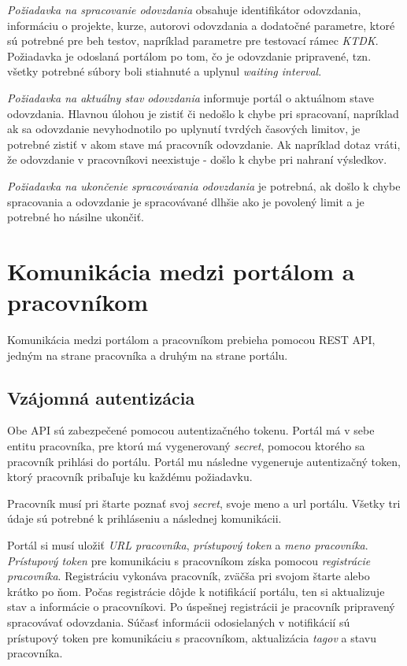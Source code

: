 \documentclass[
  digital, %
  twoside, %
  table,   %
  lof,     %
  lot,     %
]{fithesis3}
\begin{document}
\emph{Požiadavka na spracovanie odovzdania} obsahuje identifikátor odovzdania, informáciu o projekte, kurze, autorovi odovzdania a dodatočné parametre, ktoré sú potrebné pre beh testov, napríklad parametre pre testovací rámec \emph{KTDK}.
Požiadavka je odoslaná portálom po tom, čo je odovzdanie pripravené, tzn. všetky potrebné súbory boli stiahnuté a uplynul \emph{waiting interval}.

\emph{Požiadavka na aktuálny stav odovzdania} informuje portál o aktuálnom stave odovzdania. Hlavnou úlohou je zistiť či nedošlo k chybe pri spracovaní, napríklad ak sa odovzdanie nevyhodnotilo po uplynutí tvrdých časových limitov, je potrebné zistiť v akom stave má pracovník odovzdanie. Ak napríklad dotaz vráti, že odovzdanie v pracovníkovi neexistuje - došlo k chybe pri nahraní výsledkov.

\emph{Požiadavka na ukončenie spracovávania odovzdania} je potrebná, ak došlo k chybe spracovania a odovzdanie je spracovávané dlhšie ako je povolený limit a je potrebné ho násilne ukončiť.

\section{Komunikácia medzi portálom a pracovníkom}

Komunikácia medzi portálom a pracovníkom prebieha pomocou REST API, jedným na strane pracovníka a druhým na strane portálu. 

\subsection{Vzájomná autentizácia}

Obe API sú zabezpečené pomocou autentizačného tokenu. Portál má v sebe entitu pracovníka, pre ktorú má vygenerovaný \emph{secret}, pomocou ktorého sa pracovník prihlási do portálu. Portál mu následne vygeneruje autentizačný token, ktorý pracovník pribaľuje ku každému požiadavku.

Pracovník musí pri štarte poznať svoj \emph{secret}, svoje meno a url portálu. Všetky tri údaje sú potrebné k prihláseniu a následnej komunikácii. 

Portál si musí uložiť \emph{URL pracovníka}, \emph{prístupový token} a \emph {meno pracovníka}.
\emph{Prístupový token} pre komunikáciu s pracovníkom získa pomocou \emph{registrácie pracovníka}. Registráciu vykonáva pracovník, zväčša pri svojom štarte alebo krátko po ňom. Počas registrácie dôjde k notifikácií portálu, ten si aktualizuje stav a informácie o pracovníkovi. Po úspešnej registrácii je pracovník pripravený spracovávať odovzdania. Súčasť informácii odosielaných v notifikácií sú prístupový token pre komunikáciu s pracovníkom, aktualizácia \emph{tagov} a stavu pracovníka.
\end{document}
